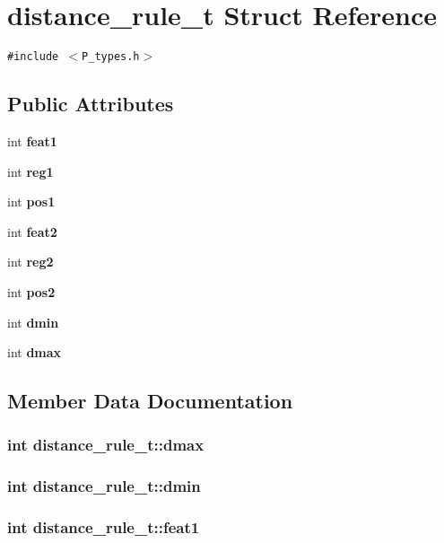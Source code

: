 \section{distance\_\-rule\_\-t  Struct Reference}
\label{structdistance__rule__t}
{\tt \#include $<$P\_\-types.h$>$}

\subsection*{Public Attributes}
\begin{CompactItemize}
\item 
int {\bf feat1}
\item 
int {\bf reg1}
\item 
int {\bf pos1}
\item 
int {\bf feat2}
\item 
int {\bf reg2}
\item 
int {\bf pos2}
\item 
int {\bf dmin}
\item 
int {\bf dmax}
\end{CompactItemize}


\subsection{Member Data Documentation}
\subsubsection{\setlength{\rightskip}{0pt plus 5cm}int distance\_\-rule\_\-t::dmax}\label{structdistance__rule__t_m7}


\subsubsection{\setlength{\rightskip}{0pt plus 5cm}int distance\_\-rule\_\-t::dmin}\label{structdistance__rule__t_m6}


\subsubsection{\setlength{\rightskip}{0pt plus 5cm}int distance\_\-rule\_\-t::feat1}\label{structdistance__rule__t_m0}


